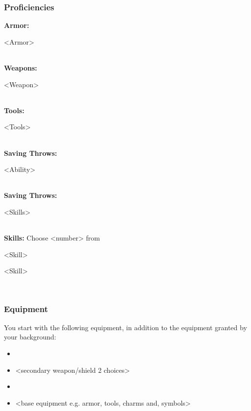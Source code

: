 \subsubsection{Proficiencies}
\textbf{Armor:} 
\begin{enumerate*}[label={},
  itemjoin={, },]
  
\item <Armor>

\end{enumerate*}\\
\textbf{Weapons:} 
\begin{enumerate*}[label={},
  itemjoin={, },]
  
\item <Weapon>

\end{enumerate*}\\
\textbf{Tools:} 
\begin{enumerate*}[label={},
  itemjoin={, },]
  
\item <Tools>

\end{enumerate*}\\
\textbf{Saving Throws:} 
\begin{enumerate*}[label={},
  itemjoin={, },]
  
\item <Ability>

\end{enumerate*}\\
\textbf{Saving Throws:} 
\begin{enumerate*}[label={},
  itemjoin={, },]
  
\item <Skills>

\end{enumerate*}\\
\textbf{Skills:} Choose <number> from 
\begin{enumerate*}[label={},
  itemjoin={, },]
  
\item <Skill>
\item <Skill>

\end{enumerate*}\\


\subsubsection{Equipment}
You start with the following equipment, in addition to the equipment granted by your background:
\begin{itemize}
\item <main weapon 2 choices>
\item <secondary weapon/shield 2 choices>
\item <starter pack 2+ choices>
\item <base equipment e.g. armor, tools, charms and, symbols>
\end{itemize}

